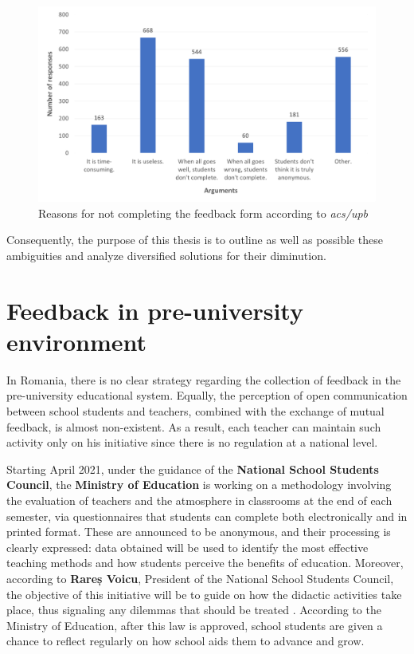 	\begin{figure}[ht]
        \centering
             \includegraphics[height=0.4\textheight]{figures/charts/survey/acs_survey_no_feedback.png}
        \caption{Reasons for not completing the feedback form according to \textit{\acrshort{acs}/\acrshort{upb}}}
        \label{2:fig:acs_survey_no_feedback}
    \end{figure}
	
	Consequently, the purpose of this thesis is to outline as well as possible these ambiguities and analyze diversified solutions for their diminution.

\section{Feedback in pre-university environment} \label{2:preuni_feedback}

    In Romania, there is no clear strategy regarding the collection of feedback in the pre-university educational system. Equally, the perception of open communication between school students and teachers, combined with the exchange of mutual feedback, is almost non-existent. As a result, each teacher can maintain such activity only on his initiative since there is no regulation at a national level.
    
	Starting April 2021, under the guidance of the \textbf{National School Students Council}, the \textbf{Ministry of Education} is working on a methodology involving the evaluation of teachers and the atmosphere in classrooms at the end of each semester, via questionnaires that students can complete both electronically and in printed format. These are announced to be anonymous, and their processing is clearly expressed: data obtained will be used to identify the most effective teaching methods and how students perceive the benefits of education. Moreover, according to \textbf{Rareș Voicu}, President of the National School Students Council, the objective of this initiative will be to guide on how the didactic activities take place, thus signaling any dilemmas that should be treated \cite{cne2021feedback}. According to the Ministry of Education, after this law is approved, school students are given a chance to reflect regularly on how school aids them to advance and grow.
	
